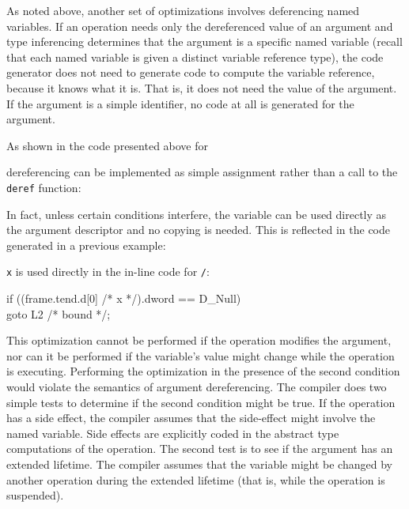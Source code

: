 As noted above, another set of optimizations involves deferencing
named variables. If an operation needs only the dereferenced value of
an argument and type inferencing determines that the argument is a
specific named variable (recall that each named variable is given a
distinct variable reference type), the code generator does not need to
generate code to compute the variable reference, because it knows what
it is. That is, it does not need the value of the argument. If the
argument is a simple identifier, no code at all is generated for the
argument.

As shown in the code presented above for 


\noindent
dereferencing can be implemented as simple assignment rather than a
call to the \texttt{deref} function:


\noindent
In fact, unless certain conditions interfere, the variable can be used
directly as the argument descriptor and no copying is needed. This is
reflected in the code generated in a previous example:



\texttt{x} is used directly in the in-line code for \texttt{/}: 

\goodbreak
\begin{iconcode}
\>if ((frame.tend.d[0] /* x */).dword == D\_Null)\\
\>\>goto L2 /* bound */;\\
\end{iconcode}

\noindent
This optimization cannot be performed if the operation modifies the
argument, nor can it be performed if the variable's value might change
while the operation is executing. Performing the optimization in the
presence of the second condition would violate the semantics of
argument dereferencing. The compiler does two simple tests to
determine if the second condition might be true. If the operation has
a side effect, the compiler assumes that the side-effect might involve
the named variable. Side effects are explicitly coded in the abstract
type computations of the operation. The second test is to see if the
argument has an extended lifetime. The compiler assumes that the
variable might be changed by another operation during the extended
lifetime (that is, while the operation is suspended).


